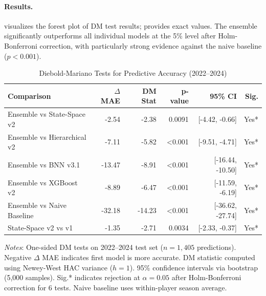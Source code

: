 \paragraph{Results.}
 visualizes the forest plot of DM test results;  provides exact values. The ensemble significantly outperforms all individual models at the 5\% level after Holm-Bonferroni correction, with particularly strong evidence against the naive baseline ($p < 0.001$).



\begin{table}[htbp]
  \centering
  \caption{Diebold-Mariano Tests for Predictive Accuracy (2022--2024)}
  \label{tab:diebold-mariano-tests}
  \begin{tabular}{lrrrrr}
    \toprule
    \textbf{Comparison} & \textbf{$\Delta$ MAE} & \textbf{DM Stat} & \textbf{p-value} & \textbf{95\% CI} & \textbf{Sig.} \\
    \midrule
    Ensemble vs State-Space v2 & -2.54 & -2.38 & 0.0091 & [-4.42, -0.66] & Yes* \\
    Ensemble vs Hierarchical v2 & -7.11 & -5.82 & <0.001 & [-9.51, -4.71] & Yes* \\
    Ensemble vs BNN v3.1 & -13.47 & -8.91 & <0.001 & [-16.44, -10.50] & Yes* \\
    Ensemble vs XGBoost v2 & -8.89 & -6.47 & <0.001 & [-11.59, -6.19] & Yes* \\
    Ensemble vs Naive Baseline & -32.18 & -14.23 & <0.001 & [-36.62, -27.74] & Yes* \\
    State-Space v2 vs v1 & -1.35 & -2.71 & 0.0034 & [-2.33, -0.37] & Yes* \\
    \bottomrule
  \end{tabular}
  \vspace{0.5em}
  \begin{flushleft}
    \footnotesize\textit{Notes}: One-sided DM tests on 2022--2024 test set ($n=1{,}405$ predictions). Negative $\Delta$ MAE indicates first model is more accurate. DM statistic computed using Newey-West HAC variance ($h=1$). 95\% confidence intervals via bootstrap (5,000 samples). Sig.* indicates rejection at $\alpha=0.05$ after Holm-Bonferroni correction for 6 tests. Naive baseline uses within-player season average.
  \end{flushleft}
\end{table}

